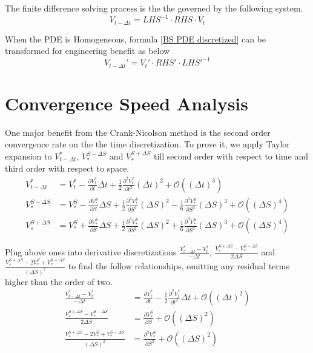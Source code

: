 \documentclass{article}
\begin{document}
The finite difference solving process is the the governed by the following system.
\begin{equation}
    V_{t - \Delta t} = {LHS}^{-1} \cdot RHS \cdot V_{t} \label{BS PDE discretized}
\end{equation}

When the PDE is Homogeneous, formula \ref{BS PDE discretized} can be transformed for engineering benefit as below
\begin{equation}
    V_{t - \Delta t}' = V_{t}' \cdot RHS' \cdot {LHS'}^{-1}
\end{equation}


\section{Convergence Speed Analysis}

One major benefit from the Crank-Nicolson method is the second order convergence rate on the the time discretization.
To prove it, we apply Taylor expansion to $ V_{t - \Delta t}^{*} $, $ V_{*}^{S - \Delta S} $ and $ V_{*}^{S + \Delta S} $ till second order with respect to time and third order with respect to space.
\begin{align}
    V_{t - \Delta t}^{*} &= V_{t}^{*} - \frac{\partial V_{t}^{*}}{\partial t} \Delta t + \frac{1}{2} \frac{\partial^2 V_{t}^{*}}{\partial t^2} (\Delta t)^2 + \mathcal{O}\left(\left(\Delta t\right)^3\right) \\
    V_{*}^{S - \Delta S} &= V_{*}^{S} - \frac{\partial V_{*}^{S}}{\partial S} \Delta S + \frac{1}{2} \frac{\partial^2 V_{*}^{S}}{\partial S^2} (\Delta S)^2 - \frac{1}{6} \frac{\partial^3 V_{*}^{S}}{\partial S^3} (\Delta S)^3 + \mathcal{O}\left(\left(\Delta S\right)^4\right) \\
    V_{*}^{S + \Delta S} &= V_{*}^{S} + \frac{\partial V_{*}^{S}}{\partial S} \Delta S + \frac{1}{2} \frac{\partial^2 V_{*}^{S}}{\partial S^2} (\Delta S)^2 + \frac{1}{6} \frac{\partial^3 V_{*}^{S}}{\partial S^3} (\Delta S)^3 + \mathcal{O}\left(\left(\Delta S\right)^4\right)
\end{align}

Plug above ones into derivative discretizations $ \frac{V_{t - \Delta t}^{*} - V_{t}^{*}}{-\Delta t} $,  $ \frac{V_{*}^{S + \Delta S} - V_{*}^{S - \Delta S}}{2 \Delta S} $ and $ \frac{V_{*}^{S + \Delta S} - 2 V_{*}^{S} + V_{*}^{S - \Delta S}}{(\Delta S)^2} $ to find the follow relationships, omitting any residual terms higher than the order of two.
\begin{align}
    \frac{V_{t - \Delta t}^{*} - V_{t}^{*}}{-\Delta t} &= \frac{\partial V_{t}^{*}}{\partial t} - \frac{1}{2} \frac{\partial^2 V_{t}^{*}}{\partial t^2} \Delta t + \mathcal{O}\left(\left(\Delta t\right)^2\right) \\
    \frac{V_{*}^{S + \Delta S} - V_{*}^{S - \Delta S}}{2 \Delta S} &= \frac{\partial V_{*}^{S}}{\partial S} + \mathcal{O}\left(\left(\Delta S\right)^2\right) \\
    \frac{V_{*}^{S + \Delta S} - 2 V_{*}^{S} + V_{*}^{S - \Delta S}}{(\Delta S)^2} &= \frac{\partial^2 V_{*}^{S}}{\partial S^2} + \mathcal{O}\left(\left(\Delta S\right)^2\right)
\end{align}
\end{document}

